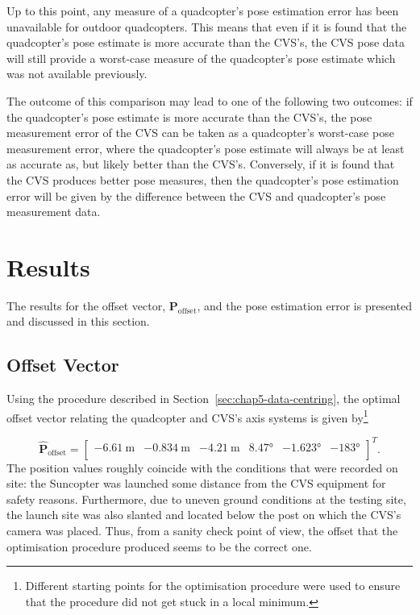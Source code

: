 Up to this point, any measure of a quadcopter's pose estimation error has been unavailable for outdoor quadcopters. This means that even if it is found that the quadcopter's pose estimate is more accurate than the CVS's, the CVS pose data will still provide a worst-case measure of the quadcopter's pose estimate which was not available previously. 

The outcome of this comparison may lead to one of the following two outcomes: if the quadcopter's pose estimate is more accurate than the CVS's, the pose measurement error of the CVS can be taken as a quadcopter's worst-case pose measurement error, where the quadcopter's pose estimate will always be at least as accurate as, but likely better than the CVS's. Conversely, if it is found that the CVS produces better pose measures, then the quadcopter's pose estimation error will be given by the difference between the CVS and quadcopter's pose measurement data. 

\section{Results}

The results for the offset vector, $\bm{P}_{\mathrm{offset}}$, and the pose estimation error is presented and discussed in this section. 

\subsection{Offset Vector}

Using the procedure described in Section~\ref{sec:chap5-data-centring}, the optimal offset vector relating the quadcopter and CVS's axis systems is given by\footnote{Different starting points for the optimisation procedure were used to ensure that the procedure did not get stuck in a local minimum.} 

\begin{equation}
  \label{eq:chap5-offset-result}
  \hat{\bm{P}}_{\mathrm{offset}} = 
  \begin{bmatrix}
    \SI{-6.61}{\m} & \SI{-0.834}{\m} & \SI{-4.21}{\m} & \ang{8.47} & \ang{-1.623} & \ang{-183} \\
  \end{bmatrix}^T.
\end{equation}
The position values roughly coincide with the conditions that were recorded on site: the Suncopter was launched some distance from the CVS equipment for safety reasons. Furthermore, due to uneven ground conditions at the testing site, the launch site was also slanted and located below the post on which the CVS's camera was placed. Thus, from a sanity check point of view, the offset that the optimisation procedure produced seems to be the correct one. 

